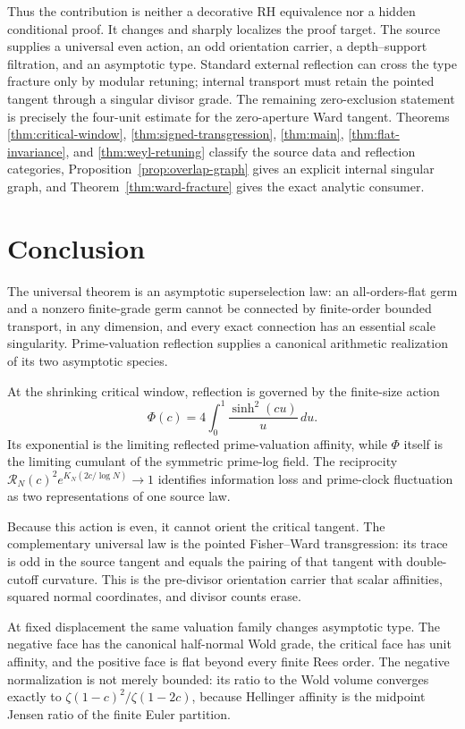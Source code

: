 \documentclass[11pt]{article}
\theoremstyle{definition}
\theoremstyle{remark}
\begin{document}
Thus the contribution is neither a decorative RH equivalence nor a hidden conditional proof.
It changes and sharply localizes the proof target.  The source supplies a universal even action,
an odd orientation carrier, a depth--support filtration, and an asymptotic type.  Standard
external reflection can cross the type fracture only by modular retuning; internal transport
must retain the pointed tangent through a singular divisor grade.  The remaining zero-exclusion
statement is precisely the
four-unit estimate for the zero-aperture Ward tangent.  Theorems
\ref{thm:critical-window}, \ref{thm:signed-transgression}, \ref{thm:main},
\ref{thm:flat-invariance}, and \ref{thm:weyl-retuning} classify the source data and reflection
categories, Proposition~\ref{prop:overlap-graph} gives an explicit internal singular graph, and
Theorem~\ref{thm:ward-fracture} gives the exact analytic consumer.

\section{Conclusion}\label{sec:conclusion}

The universal theorem is an asymptotic superselection law: an all-orders-flat germ and a
nonzero finite-grade germ cannot be connected by finite-order bounded transport, in any
dimension, and every exact connection has an essential scale singularity.  Prime-valuation
reflection supplies a canonical arithmetic realization of its two asymptotic species.

At the shrinking critical window, reflection is governed by the finite-size action
\[
 \Phi(c)=4\int_0^1\frac{\sinh^2(cu)}u\,du.
\]
Its exponential is the limiting reflected prime-valuation affinity, while \(\Phi\) itself is
the limiting cumulant of the symmetric prime-log field.  The reciprocity
\(\mathcal R_N(c)^2e^{K_N(2c/\log N)}\to1\) identifies information loss and prime-clock
fluctuation as two representations of one source law.

Because this action is even, it cannot orient the critical tangent.  The complementary universal
law is the pointed Fisher--Ward transgression: its trace is odd in the source tangent and equals
the pairing of that tangent with double-cutoff curvature.  This is the pre-divisor orientation
carrier that scalar affinities, squared normal coordinates, and divisor counts erase.

At fixed displacement the same valuation family changes asymptotic type.  The negative face has
the canonical half-normal Wold grade, the critical face has unit affinity, and the positive face
is flat beyond every finite Rees order.  The negative normalization is not merely bounded: its
ratio to the Wold volume converges exactly to
\(\zeta(1-c)^2/\zeta(1-2c)\), because Hellinger affinity is the midpoint Jensen ratio of the
finite Euler partition.
\end{document}
